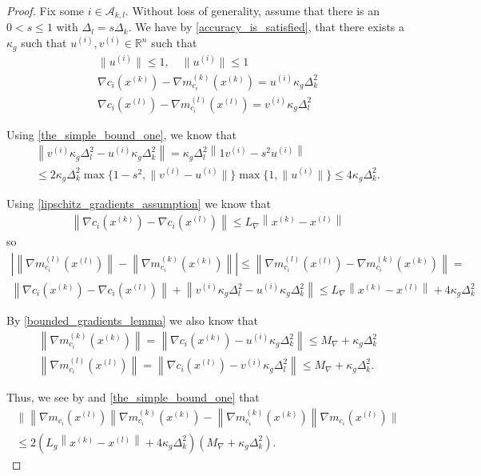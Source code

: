 \documentclass{article}
\theoremstyle{case}
\newcommand{\lipgrad}{{L_{\nabla}}}
\newcommand{\maxgrad}{{M_{\nabla}}}
\newcommand{\xk}{{x^{(k)}}}
\newcommand{\Rn}{\mathbb R^n}
\newcommand{\dk}{\Delta_k}
\newcommand{\gmcik}{{\nabla m_{c_i}^{(k)}(\xk)}}
\begin{document}
\begin{proof}
Fix some $i \in \mathcal A_{k, l}$.
Without loss of generality, assume that there is an $0 < s \le 1$ with $\Delta_l = s \dk$.
We have by \cref{accuracy_is_satisfied}, that there exists a $\kappa_{g}$ such that $u^{(i)}, v^{(i)}\in\Rn$ such that 
\begin{align}
\|u^{(i)} \| \le 1, \quad 
\|u^{(i)} \| \le 1 \\
\nabla c_i(\xk) - \gmcik = u^{(i)} \kappa_{g}\dk^2  \\
\nabla c_i(x^{(l)} ) - \nabla m_{c_i}^{(l)}\left(x^{(l)}\right) = v^{(i)} \kappa_{g}\Delta_{l}^2
\end{align}

Using \cref{the_simple_bound_one}, we know that
\begin{align*}
\left\|v^{(i)} \kappa_{g}\Delta_{l}^2 - u^{(i)} \kappa_{g}\dk^2\right\| 
 = \kappa_{g}\Delta_l^2 \left\|1v^{(i)} - s^2u^{(i)}\right\| \\
\le 2 \kappa_g \dk^2\max\{1 - s^2, \|v^{(i)} - u^{(i)}\|\}\max\{1, \|u^{(i)}\|\}
\le 4\kappa_{g}\dk^2.
\end{align*}

Using \cref{lipschitz_gradients_assumption} we know that
\begin{align*}
\left\|\nabla c_i(\xk) - \nabla c_i(x^{(l)} ) \right\| \le \lipgrad \left\|\xk - x^{(l)}\right\|
\end{align*}
so
\begin{align*}
\left|\left\|\nabla m_{c_i}^{(l)}\left(x^{(l)}\right)\right\| - \left\|\gmcik\right\|  \right| \le
\left\|\nabla m_{c_i}^{(l)}\left(x^{(l)}\right) - \gmcik\right\| = \\
\left\|\nabla c_i(\xk) - \nabla c_i(x^{(l)} ) \right\| +  \left\|v^{(i)} \kappa_{g}\Delta_{l}^2 - u^{(i)} \kappa_{g}\dk^2\right\|
\le \lipgrad\left\|\xk - x^{(l)}\right\| + 4\kappa_{g}\dk^2
\end{align*}

By \cref{bounded_gradients_lemma} we also know that
\begin{align*}
\left\| \gmcik \right\| = \left\|\nabla c_i(\xk) - u^{(i)} \kappa_{g}\dk^2 \right\| \le \maxgrad + \kappa_g\dk^2  \\
\left\|\nabla m_{c_i}^{(l)}\left(x^{(l)}\right) \right\|= \left\|\nabla c_i(x^{(l)} )  - v^{(i)} \kappa_{g}\Delta_{l}^2 \right\| \le \maxgrad + \kappa_g\dk^2.
\end{align*}

Thus, we see by and \cref{the_simple_bound_one} that 
\begin{align}
\bigg\|  \left\|\nabla m_{c_i}\left(x^{(l)}\right)\right\|\gmcik - \left\|\gmcik\right\| \nabla m_{c_i}\left(x^{(l)}\right)\bigg\| \\
\le 2 \left(L_g\left\|\xk - x^{(l)}\right\| + 4\kappa_{g}\dk^2\right)\left(\maxgrad + \kappa_g\dk^2\right).
\end{align}


\end{proof}
\end{document}
